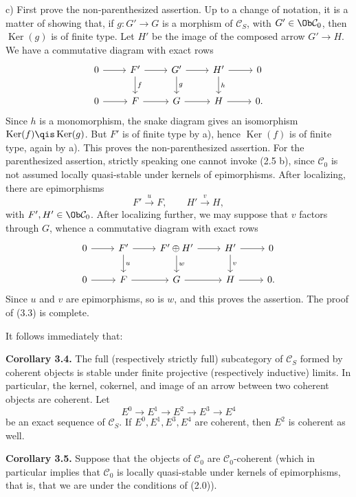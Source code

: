 \documentclass[11pt]{article}
\providecommand{\Ker}{\operatorname{Ker}}
\begin{document}
c) First prove the non-parenthesized assertion. Up to a change of notation, it is a matter of showing that, if \(g:G'\to G\) is a morphism of \(\mathcal C_S\), with \(G'\in\Ob\mathcal C_0\), then \(\Ker(g)\) is of finite type. Let \(H'\) be the image of the composed arrow \(G'\to H\). We have a commutative diagram with exact rows
\[
\begin{tikzcd}
0\arrow[r]&F'\arrow[r]\arrow[d,"f"]&G'\arrow[r]\arrow[d,"g"]&H'\arrow[r]\arrow[d,"h"]&0\\
0\arrow[r]&F\arrow[r]&G\arrow[r]&H\arrow[r]&0 .
\end{tikzcd}
\]
Since \(h\) is a monomorphism, the snake diagram gives an isomorphism \(\Ker(f)\qis\Ker(g)\). But \(F'\) is of finite type by a), hence \(\Ker(f)\) is of finite type, again by a). This proves the non-parenthesized assertion. For the parenthesized assertion, strictly speaking one cannot invoke (2.5 b), since \(\mathcal C_0\) is not assumed locally quasi-stable under kernels of epimorphisms. After localizing, there are epimorphisms
\[
  F'\xrightarrow{u}F,
  \qquad H'\xrightarrow{v}H,
\]
with \(F',H'\in\Ob\mathcal C_0\). After localizing further, we may suppose that \(v\) factors through \(G\), whence a commutative diagram with exact rows
\[
\begin{tikzcd}
0\arrow[r]&F'\arrow[r]\arrow[d,"u"]&F'\oplus H'\arrow[r]\arrow[d,"w"]&H'\arrow[r]\arrow[d,"v"]&0\\
0\arrow[r]&F\arrow[r]&G\arrow[r]&H\arrow[r]&0 .
\end{tikzcd}
\]
Since \(u\) and \(v\) are epimorphisms, so is \(w\), and this proves the assertion. The proof of (3.3) is complete.

It follows immediately that:

\textbf{Corollary 3.4.} The full (respectively strictly full) subcategory of \(\mathcal C_S\) formed by coherent objects is stable under finite projective (respectively inductive) limits. In particular, the kernel, cokernel, and image of an arrow between two coherent objects are coherent. Let
\[
  E^0\longrightarrow E^1\longrightarrow E^2\longrightarrow E^3\longrightarrow E^4
\]
be an exact sequence of \(\mathcal C_S\). If \(E^0,E^1,E^3,E^4\) are coherent, then \(E^2\) is coherent as well.

\textbf{Corollary 3.5.} Suppose that the objects of \(\mathcal C_0\) are \(\mathcal C_0\)-coherent (which in particular implies that \(\mathcal C_0\) is locally quasi-stable under kernels of epimorphisms, that is, that we are under the conditions of (2.0)).
\end{document}

